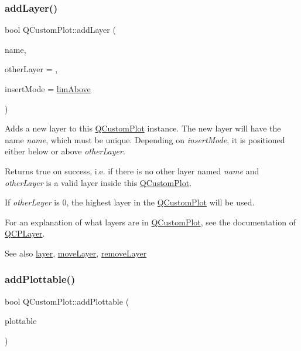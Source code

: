 \subsubsection{\texorpdfstring{add\+Layer()}{addLayer()}}
{\footnotesize\ttfamily bool Q\+Custom\+Plot\+::add\+Layer (\begin{DoxyParamCaption}\item[{const Q\+String \&}]{name,  }\item[{\mbox{\hyperlink{class_q_c_p_layer}{Q\+C\+P\+Layer}} $\ast$}]{other\+Layer = {},  }\item[{\mbox{\hyperlink{class_q_custom_plot_a75a8afbe6ef333b1f3d47abb25b9add7}{Q\+Custom\+Plot\+::\+Layer\+Insert\+Mode}}}]{insert\+Mode = {\ttfamily \mbox{\hyperlink{class_q_custom_plot_a75a8afbe6ef333b1f3d47abb25b9add7a062b0b7825650b432a713c0df6742d41}{lim\+Above}}} }\end{DoxyParamCaption})}

Adds a new layer to this \mbox{\hyperlink{class_q_custom_plot}{Q\+Custom\+Plot}} instance. The new layer will have the name {\itshape name}, which must be unique. Depending on {\itshape insert\+Mode}, it is positioned either below or above {\itshape other\+Layer}.

Returns true on success, i.\+e. if there is no other layer named {\itshape name} and {\itshape other\+Layer} is a valid layer inside this \mbox{\hyperlink{class_q_custom_plot}{Q\+Custom\+Plot}}.

If {\itshape other\+Layer} is 0, the highest layer in the \mbox{\hyperlink{class_q_custom_plot}{Q\+Custom\+Plot}} will be used.

For an explanation of what layers are in \mbox{\hyperlink{class_q_custom_plot}{Q\+Custom\+Plot}}, see the documentation of \mbox{\hyperlink{class_q_c_p_layer}{Q\+C\+P\+Layer}}.

\begin{DoxySeeAlso}{See also}
\mbox{\hyperlink{class_q_custom_plot_a0a96244e7773b242ef23c32b7bdfb159}{layer}}, \mbox{\hyperlink{class_q_custom_plot_ae896140beff19424e9e9e02d6e331104}{move\+Layer}}, \mbox{\hyperlink{class_q_custom_plot_a40f75e342c5eaab6a86066a42a0e2a94}{remove\+Layer}} 
\end{DoxySeeAlso}
\mbox{\label{class_q_custom_plot_ab7ad9174f701f9c6f64e378df77927a6}} 
\subsubsection{\texorpdfstring{add\+Plottable()}{addPlottable()}}
{\footnotesize\ttfamily bool Q\+Custom\+Plot\+::add\+Plottable (\begin{DoxyParamCaption}\item[{\mbox{\hyperlink{class_q_c_p_abstract_plottable}{Q\+C\+P\+Abstract\+Plottable}} $\ast$}]{plottable }\end{DoxyParamCaption})}

